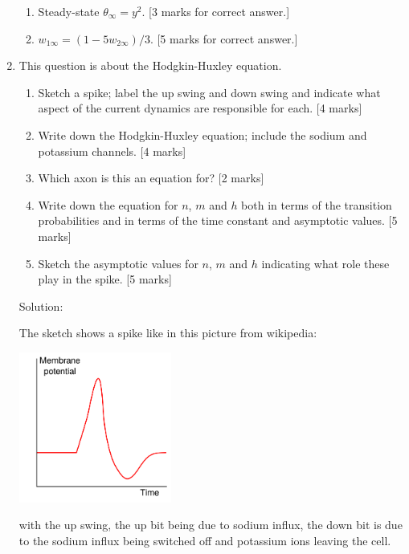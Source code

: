 \documentclass[a4paper,12pt]{article}
\newif\ifsoln
\begin{document}
\begin{enumerate}
\begin{enumerate}
\item Steady-state $\theta_\infty = y^2$. [3 marks for correct answer.]

\item $w_{1 \infty} = (1-5w_{2 \infty})/3$. [5 marks for correct answer.]

\end{enumerate}

\fi

\item This question is about the Hodgkin-Huxley equation.

\begin{enumerate}

\item Sketch a spike; label the up swing and down swing and indicate
  what aspect of the current dynamics are responsible for each. [4 marks]

\item Write down the Hodgkin-Huxley equation; include the sodium and potassium channels. [4 marks]

\item Which axon is this an equation for? [2 marks]

\item Write down the equation for $n$, $m$ and $h$ both in terms of
  the transition probabilities and in terms of the time constant and
  asymptotic values. [5 marks]

\item Sketch the asymptotic values for $n$, $m$ and $h$ indicating
  what role these play in the spike. [5 marks]

\end{enumerate}

\ifsoln Solution:  

The sketch shows a spike like in this picture from wikipedia:
\begin{center}
\includegraphics[width=5cm]{Action_potential_basic_shape.png}
\end{center}
with the up swing, the up bit being due to sodium influx, the down bit is due to the sodium influx being switched off and potassium ions leaving the cell.


\end{enumerate}
\end{document}
